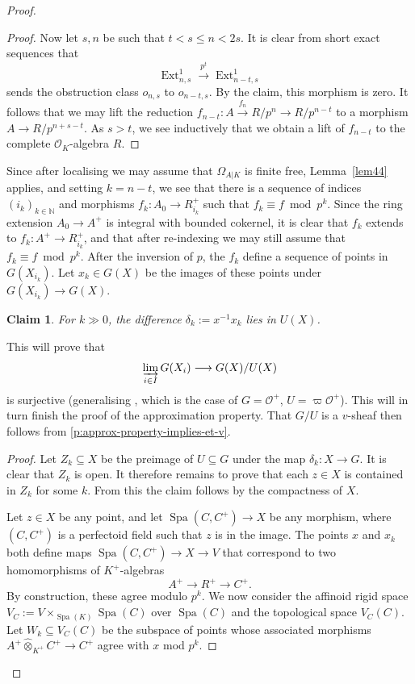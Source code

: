 \documentclass[10pt,a4paper]{article}
\newtheorem{Claim}[thm]{Claim}
\theoremstyle{definition}
\theoremstyle{remark}
\newcommand{\lra}{\longrightarrow}
\newcommand{\N}{\mathbb{N}}
\renewcommand{\O}{\mathcal{O}}
\newcommand{\Spa}{\operatorname{Spa}}
\newcommand{\Ext}{\operatorname{Ext}}
\numberwithin{equation}{section}
\begin{document}
\begin{proof}
\begin{proof}
 		Now let  $s,n$ be such that $t<s\leq n< 2s$. It is clear from short exact sequences  that
 		\[ \Ext_{n,s}^1\overset{p^t}\lra\Ext_{n-t,s}^1\]
 		sends the obstruction class $o_{n,s}$ to $o_{n-t,s}$. By the claim, this morphism is zero. It follows that we may lift the reduction $f_{n-t}\colon A\xrightarrow{f_n} R/p^n\to R/p^{n-t}$ to a morphism $A\to R/p^{n+s-t}$. As $s>t$, we see inductively that we obtain a lift of $f_{n-t}$ to the complete $\O_K$-algebra $R$.
 	\end{proof}
        
	Since after localising we may assume that $\Omega_{A|K}$ is finite free, Lemma~\ref{lem44}  applies, and setting $k=n-t$, we see that there is a sequence of indices $(i_k)_{k\in \N}$ and morphisms $f_k\colon A_0\to R^+_{i_k}$ such that $f_k\equiv f\bmod p^k$. Since the ring extension $A_0\to A^+$ is integral with bounded cokernel, it is clear that $f_k$ extends to $f_k\colon A^+\to R^+_{i_k}$, and that after re-indexing we may still assume that $f_k\equiv f\bmod p^k$. After the inversion of $p$, the $f_k$ define a sequence of points in $G(X_{i_k})$. Let $x_{k}\in G(X)$ be the images of these points under $G(X_{i_k})\to G(X)$.
        
	\begin{Claim}\label{cl:diff-in-U(X)}
		For $k\gg 0$, the difference $\delta_k:=x^{-1}x_k$ lies in $U(X)$.
	\end{Claim}

        This will prove that
	\[ \varinjlim_{i\in I} G(X_i)\lra G(X)/U(X)\]
	is surjective (generalising \cite[Lemma~3.10]{heuer-diamantine-Picard}, which is the case of $G=\O^+$, $U=\varpi\O^+$). This will in turn finish the proof of the approximation property. That $G/U$ is a $v$-sheaf then follows from \cref{p:approx-property-implies-et-v}.

        \begin{proof}
		Let $Z_k\subseteq X$ be the preimage of $U\subseteq G$ under the map
		$\delta_k\colon X\to G$.
		It is clear that $Z_k$ is open. It therefore remains to prove that each $z\in X$ is contained in $Z_k$ for some $k$. From this the claim follows by the compactness of $X$.
		
		Let $z\in X$ be any point, and let $\Spa(C,C^+)\to X$ be any morphism, where $(C,C^+)$ is a perfectoid field such that $z$ is in the image. The points $x$ and $x_k$ both define maps
		$\Spa(C,C^+)\to X\to V$
		that correspond to two homomorphisms of $K^+$-algebras
		\[ A^+\lra R^+\lra C^+.\]
		By construction, these agree modulo $p^k$. 
		We now consider the affinoid rigid space $V_C:=V\times_{\Spa(K)}\Spa(C)$ over $\Spa(C)$ and the topological space $V_C(C)$. Let $W_k\subseteq V_C(C)$ be the subspace of points whose associated morphisms $A^+\hat{\otimes}_{K^+}C^+\to C^+$ agree with $x$ mod $p^k$.
                

\end{proof}
\end{proof}
\end{document}
